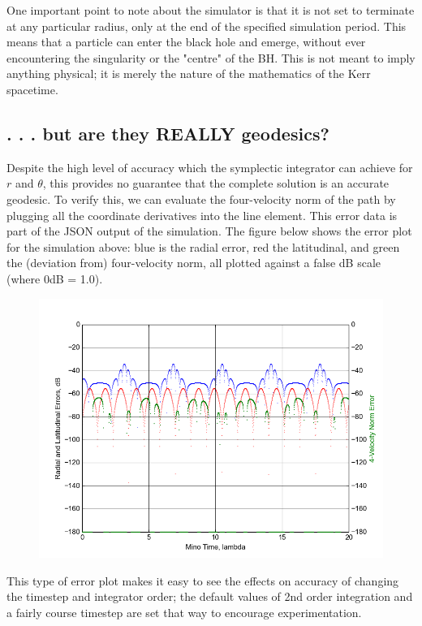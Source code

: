 \documentclass[11pt]{article}
\begin{document}
One important point to note about the simulator is that it is not set to terminate at any particular radius, only at the end of the specified simulation period.  This means that a particle can enter the black hole and emerge, without ever encountering the singularity or the "centre" of the BH.  This is not meant to imply anything physical; it is merely the nature of the mathematics of the Kerr spacetime.

\subsection{. . . but are they REALLY geodesics?}

Despite the high level of accuracy which the symplectic integrator can achieve for $r$ and $\theta$, this provides no guarantee that the complete solution is an accurate geodesic.  To verify this, we can evaluate the four-velocity norm of the path by plugging all the coordinate derivatives into the line element.  This error data is part of the JSON output of the simulation.  The figure below shows the error plot for the simulation above: blue is the radial error, red the latitudinal, and green the (deviation from) four-velocity norm, all plotted against a false dB scale (where 0dB = 1.0).
\begin{figure}[h]
\includegraphics[width=\textwidth]{figure_1}
\end{figure}
This type of error plot makes it easy to see the effects on accuracy of changing the timestep and integrator order; the default values of 2nd order integration and a fairly course timestep are set that way to encourage experimentation.
\end{document}
